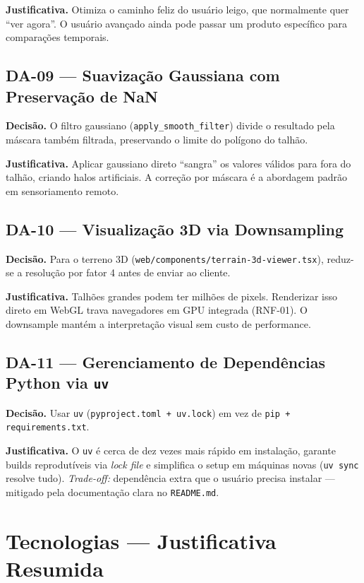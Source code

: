 \documentclass[11pt, a4paper]{article}
\begin{document}
\textbf{Justificativa.} Otimiza o caminho feliz do usuário leigo, que normalmente quer ``ver agora''. O usuário avançado ainda pode passar um produto específico para comparações temporais.

\subsection*{DA-09 --- Suavização Gaussiana com Preservação de NaN}

\textbf{Decisão.} O filtro gaussiano (\texttt{apply\_smooth\_filter}) divide o resultado pela máscara também filtrada, preservando o limite do polígono do talhão.

\textbf{Justificativa.} Aplicar gaussiano direto ``sangra'' os valores válidos para fora do talhão, criando halos artificiais. A correção por máscara é a abordagem padrão em sensoriamento remoto.

\subsection*{DA-10 --- Visualização 3D via Downsampling}

\textbf{Decisão.} Para o terreno 3D (\texttt{web/components/terrain-3d-viewer.tsx}), reduz-se a resolução por fator 4 antes de enviar ao cliente.

\textbf{Justificativa.} Talhões grandes podem ter milhões de pixels. Renderizar isso direto em WebGL trava navegadores em GPU integrada (RNF-01). O downsample mantém a interpretação visual sem custo de performance.

\subsection*{DA-11 --- Gerenciamento de Dependências Python via \texttt{uv}}

\textbf{Decisão.} Usar \texttt{uv} (\texttt{pyproject.toml + uv.lock}) em vez de \texttt{pip + requirements.txt}.

\textbf{Justificativa.} O \texttt{uv} é cerca de dez vezes mais rápido em instalação, garante builds reprodutíveis via \textit{lock file} e simplifica o setup em máquinas novas (\texttt{uv sync} resolve tudo). \textit{Trade-off:} dependência extra que o usuário precisa instalar --- mitigado pela documentação clara no \texttt{README.md}.

\section{Tecnologias --- Justificativa Resumida}
\end{document}
